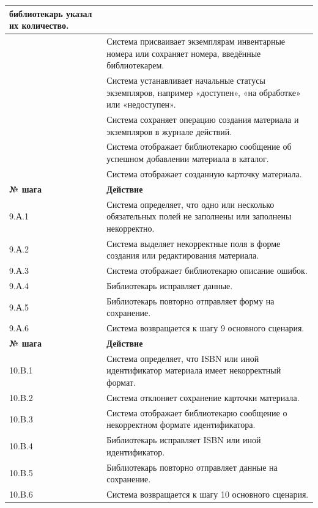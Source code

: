 \documentclass[12pt,a4paper]{article}
\begin{document}
\begin{xltabular}{\textwidth}{
				|>{\raggedright\arraybackslash}p{2.7cm}
				|>{\raggedright\arraybackslash}X|
			}
			библиотекарь указал их количество. \\
			 & Система присваивает экземплярам инвентарные номера или сохраняет
			номера, введённые библиотекарем. \\
			 & Система устанавливает начальные статусы экземпляров, например
			«доступен», «на обработке» или «недоступен». \\
			 & Система сохраняет операцию создания материала и экземпляров в журнале
			действий. \\
			 & Система отображает библиотекарю сообщение об успешном добавлении
			материала в каталог. \\
			 & Система отображает созданную карточку материала. \\
			\hline
			
			
			\textbf{№ шага} & \textbf{Действие} \\
			\hline
			
			9.А.1 & Система определяет, что одно или несколько обязательных полей не
			заполнены или заполнены некорректно. \\
			\hline
			9.А.2 & Система выделяет некорректные поля в форме создания или
			редактирования материала. \\
			\hline
			9.А.3 & Система отображает библиотекарю описание ошибок. \\
			\hline
			9.А.4 & Библиотекарь исправляет данные. \\
			\hline
			9.А.5 & Библиотекарь повторно отправляет форму на сохранение. \\
			\hline
			9.А.6 & Система возвращается к шагу 9 основного сценария. \\
			\hline
			
			
			\textbf{№ шага} & \textbf{Действие} \\
			\hline
			
			10.B.1 & Система определяет, что ISBN или иной идентификатор материала имеет
			некорректный формат. \\
			\hline
			10.B.2 & Система отклоняет сохранение карточки материала. \\
			\hline
			10.B.3 & Система отображает библиотекарю сообщение о некорректном формате
			идентификатора. \\
			\hline
			10.B.4 & Библиотекарь исправляет ISBN или иной идентификатор. \\
			\hline
			10.B.5 & Библиотекарь повторно отправляет данные на сохранение. \\
			\hline
			10.B.6 & Система возвращается к шагу 10 основного сценария. \\
			\hline
			

\end{xltabular}
\end{document}

